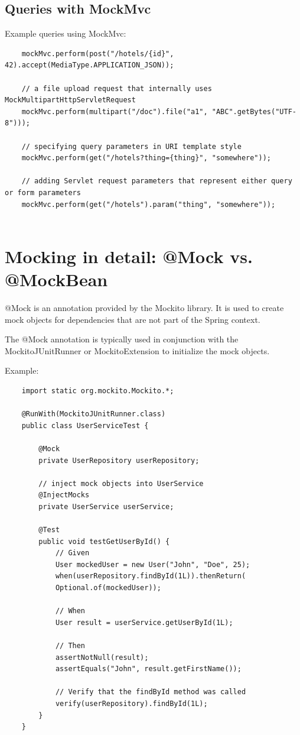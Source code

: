 \documentclass{scrartcl}
\begin{document}
\subsection{Queries with MockMvc}

Example queries using MockMvc:

\begin{lstlisting}
    mockMvc.perform(post("/hotels/{id}", 42).accept(MediaType.APPLICATION_JSON));

    // a file upload request that internally uses MockMultipartHttpServletRequest
    mockMvc.perform(multipart("/doc").file("a1", "ABC".getBytes("UTF-8")));

    // specifying query parameters in URI template style
    mockMvc.perform(get("/hotels?thing={thing}", "somewhere"));

    // adding Servlet request parameters that represent either query or form parameters
    mockMvc.perform(get("/hotels").param("thing", "somewhere"));


\end{lstlisting}


\section{Mocking in detail: @Mock vs. @MockBean}

@Mock is an annotation provided by the Mockito library. It is used to create mock objects for dependencies that are not part of the Spring context.

The @Mock annotation is typically used in conjunction with the MockitoJUnitRunner or MockitoExtension to initialize the mock objects.

Example:

\begin{lstlisting}
    import static org.mockito.Mockito.*;

    @RunWith(MockitoJUnitRunner.class)
    public class UserServiceTest {

        @Mock
        private UserRepository userRepository;

        // inject mock objects into UserService
        @InjectMocks
        private UserService userService;

        @Test
        public void testGetUserById() {
            // Given
            User mockedUser = new User("John", "Doe", 25);
            when(userRepository.findById(1L)).thenReturn(
            Optional.of(mockedUser));

            // When
            User result = userService.getUserById(1L);

            // Then
            assertNotNull(result);
            assertEquals("John", result.getFirstName());

            // Verify that the findById method was called
            verify(userRepository).findById(1L);
        }
    }
\end{lstlisting}
\end{document}
